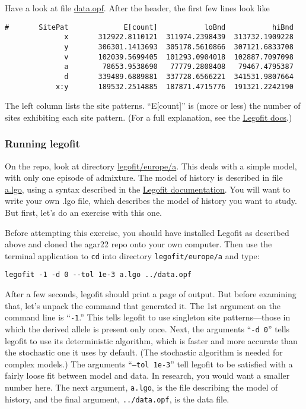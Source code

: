 \documentclass[11pt]{article}
\begin{document}
Have a look at file
\href{https://github.com/alanrogers/agar22/blob/main/legofit/europe/data.opf}{data.opf}. After
the header, the first few lines look like
\begin{verbatim}
#       SitePat             E[count]           loBnd           hiBnd
              x       312922.8110121  311974.2398439  313732.1909228
              y       306301.1413693  305178.5610866  307121.6833708
              v       102039.5699405  101293.0904018  102887.7097098
              a        78653.9538690   77779.2808408   79467.4795387
              d       339489.6889881  337728.6566221  341531.9807664
            x:y       189532.2514885  187871.4715776  191321.2242190
\end{verbatim}
The left column lists the site patterns. ``E[count]'' is (more or
less) the number of sites exhibiting each site pattern. (For a full
explanation, see the
\href{https://alanrogers.github.io/legofit/html/index.html#sitepattern}{Legofit
  docs}.)


\subsubsection{Running legofit}
On the repo, look at directory
\href{https://github.com/alanrogers/agar22/tree/main/legofit/europe/a}{legofit/europe/a}. This
deals with a simple model, with only one episode of admixture. The
model of history is described in file
\href{https://github.com/alanrogers/agar22/tree/main/legofit/europe/a/a.lgo}{a.lgo},
using a syntax described in the
\href{https://alanrogers.github.io/legofit/html/index.html#lgo}{Legofit
  documentation}. You will want to write your own .lgo file, which
describes the model of history you want to study. But first, let's
do an exercise with this one.

Before attempting this exercise, you should have installed Legofit as
described above and cloned the agar22 repo onto your own
computer. Then use the terminal application to \texttt{cd} into
directory \texttt{legofit/europe/a} and type:
\begin{verbatim}
legofit -1 -d 0 --tol 1e-3 a.lgo ../data.opf
\end{verbatim}
After a few seconds, legofit should print a page of output. But before
examining that, let's unpack the command that generated it. The 1st
argument on the command line is ``\texttt{-1}.'' This tells legofit to
use singleton site patterns---those in which the derived allele is
present only once. Next, the arguments ``\texttt{-d 0}'' tells legofit
to use its deterministic algorithm, which is faster and more accurate
than the stochastic one it uses by default. (The stochastic algorithm
is needed for complex models.) The arguments ``\texttt{--tol 1e-3}''
tell legofit to be satisfied with a fairly loose fit between model and
data. In research, you would want a smaller number here. The next
argument, \texttt{a.lgo}, is the file describing the model of history,
and the final argument, \texttt{../data.opf}, is the data file.
\end{document}
